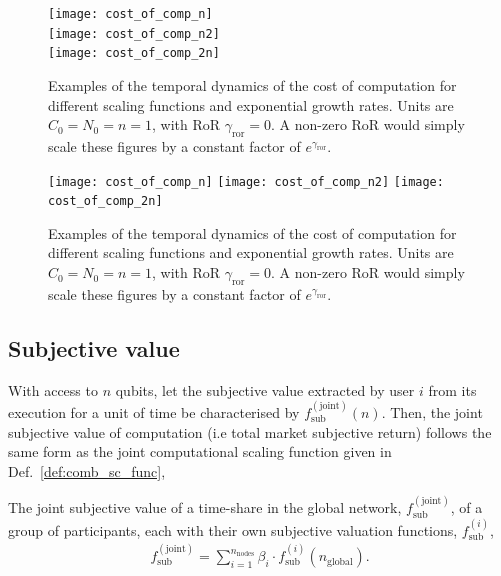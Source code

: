 \pubmode
\begin{figure}[!htbp]
\texttt{[image: cost\_of\_comp\_n]}\\
\texttt{[image: cost\_of\_comp\_n2]}\\
\texttt{[image: cost\_of\_comp\_2n]}
\captionspacefig \caption{Examples of the temporal dynamics of the cost of computation for different scaling functions and exponential growth rates. Units are \mbox{$C_0=N_0=n=1$}, with RoR \mbox{$\gamma_\mathrm{ror}=0$}. A non-zero RoR would simply scale these figures by a constant factor of $e^{\gamma_\mathrm{ror}}$.}\label{fig:econ_cost_of_comp}
\end{figure}
\else
\begin{figure}[!htbp]
\texttt{[image: cost\_of\_comp\_n]}
\texttt{[image: cost\_of\_comp\_n2]}
\texttt{[image: cost\_of\_comp\_2n]}
\captionspacefig \caption{Examples of the temporal dynamics of the cost of computation for different scaling functions and exponential growth rates. Units are \mbox{$C_0=N_0=n=1$}, with RoR \mbox{$\gamma_\mathrm{ror}=0$}. A non-zero RoR would simply scale these figures by a constant factor of $e^{\gamma_\mathrm{ror}}$.}\label{fig:econ_cost_of_comp}
\end{figure}
\fi

\subsection{Subjective value}

With access to $n$ qubits, let the subjective value extracted by user $i$ from its execution for a unit of time be characterised by $f_\mathrm{sub}^\mathrm{(joint)}(n)$. Then, the joint subjective value of computation (i.e total market subjective return) follows the same form as the joint computational scaling function given in Def.~\ref{def:comb_sc_func},

\begin{definition}\label{def:sub_val_comp}
The joint subjective value of a time-share in the global network, $f_\mathrm{sub}^\mathrm{(joint)}$, of a group of participants, each with their own subjective valuation functions, $f_\mathrm{sub}^{(i)}$,
\begin{align}
	f_\mathrm{sub}^\mathrm{(joint)} = \sum_{i=1}^{n_{\mathrm{nodes}}} \beta_i \cdot f_\mathrm{sub}^{(i)}(n_\mathrm{global}).
\end{align}
\end{definition}

